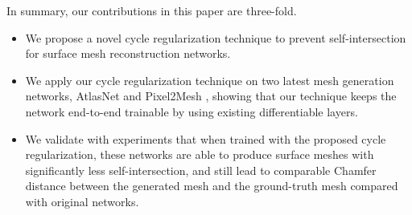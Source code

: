 In summary, our contributions in this paper are three-fold.
\begin{itemize}
	\item We propose a novel cycle regularization technique to prevent self-intersection for surface mesh reconstruction networks. 
	\item We apply our cycle regularization technique on two latest mesh generation networks, AtlasNet \cite{atlasnet} and Pixel2Mesh \cite{pixel2mesh}, showing that our technique keeps the network end-to-end trainable by using existing differentiable layers.
	\item We validate with experiments that when trained with the proposed cycle regularization, these networks are able to produce surface meshes with significantly less self-intersection, and still lead to comparable  Chamfer distance between the generated mesh and the ground-truth mesh compared with original networks. 
\end{itemize}

 